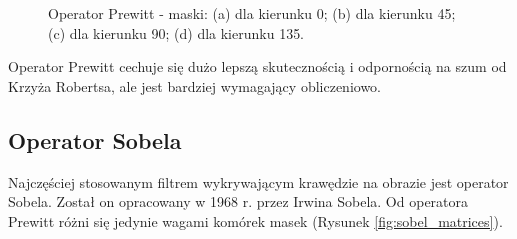 \documentclass[a4paper,twocolumn,12pt]{article}
\begin{document}
\begin{figure}[!ht]
 \begin{center}
 \end{center}
 \caption{
  Operator Prewitt - maski:
  (a) dla kierunku 0\textdegree;
  (b) dla kierunku 45\textdegree;
  (c) dla kierunku 90\textdegree;
  (d) dla kierunku 135\textdegree.
 }
 \label{fig:prewitt_matrices}
\end{figure}

Operator Prewitt cechuje się dużo lepszą skutecznością i odpornością na szum od Krzyża Robertsa, ale jest bardziej wymagający obliczeniowo.


\subsection{Operator Sobela}

Najczęściej stosowanym filtrem wykrywającym krawędzie na obrazie jest operator Sobela.
Został on opracowany w 1968 r. przez Irwina Sobela.
Od operatora Prewitt różni się jedynie wagami komórek masek (Rysunek \ref{fig:sobel_matrices}).
\end{document}
